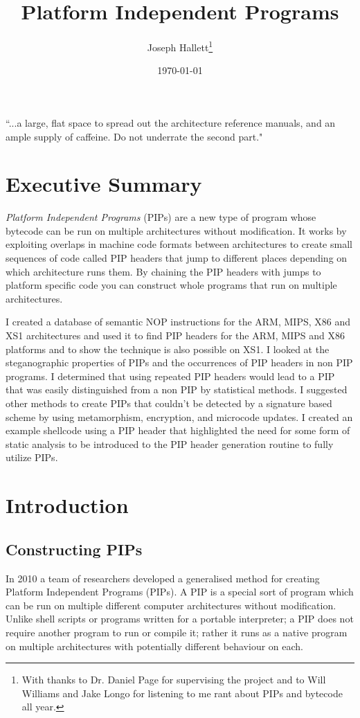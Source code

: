 \documentclass[10pt,]{book}
\title{Platform Independent Programs}
\author{Joseph
                Hallett\thanks{With thanks to Dr. Daniel Page for supervising the project and to Will Williams and Jake Longo for listening to me rant about PIPs and bytecode all year.}}
\date{\today}
\begin{document}
\maketitle

\epigraph{\textsf{``{.}{.}{.}a large, flat space to spread out the architecture reference manuals, and an ample supply of caffeine. Do not underrate the second part."}}{}

\tableofcontents
\listoftables
\lstlistoflistings
\chapter{Executive Summary}

\emph{Platform Independent Programs} (PIPs) are a new type of program
whose bytecode can be run on multiple architectures without
modification. It works by exploiting overlaps in machine code formats
between architectures to create small sequences of code called PIP
headers that jump to different places depending on which architecture
runs them. By chaining the PIP headers with jumps to platform specific
code you can construct whole programs that run on multiple
architectures.

I created a database of semantic NOP instructions for the ARM, MIPS, X86
and XS1 architectures and used it to find PIP headers for the ARM, MIPS
and X86 platforms and to show the technique is also possible on XS1. I
looked at the steganographic properties of PIPs and the occurrences of
PIP headers in non PIP programs. I determined that using repeated PIP
headers would lead to a PIP that was easily distinguished from a non PIP
by statistical methods. I suggested other methods to create PIPs that
couldn't be detected by a signature based scheme by using metamorphism,
encryption, and microcode updates. I created an example shellcode using
a PIP header that highlighted the need for some form of static analysis
to be introduced to the PIP header generation routine to fully utilize
PIPs.

\chapter{Introduction}

\section{Constructing PIPs}

In 2010 a team of researchers developed a generalised method for
creating Platform Independent Programs (PIPs)\autocite{Cha:2010uh}. A
PIP is a special sort of program which can be run on multiple different
computer architectures without modification. Unlike shell scripts or
programs written for a portable interpreter; a PIP does not require
another program to run or compile it; rather it runs as a native program
on multiple architectures with potentially different behaviour on each.
\end{document}
